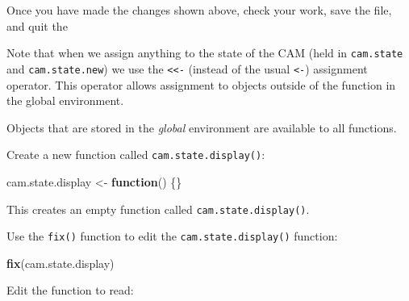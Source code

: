 \documentclass[12pt,a4paper]{book}
\newenvironment{Shaded}{\begin{snugshade}}{\end{snugshade}}
\newcommand{\ControlFlowTok}[1]{\textcolor[rgb]{0.13,0.29,0.53}{\textbf{#1}}}
\newcommand{\DataTypeTok}[1]{\textcolor[rgb]{0.13,0.29,0.53}{#1}}
\newcommand{\DecValTok}[1]{\textcolor[rgb]{0.00,0.00,0.81}{#1}}
\newcommand{\KeywordTok}[1]{\textcolor[rgb]{0.13,0.29,0.53}{\textbf{#1}}}
\newcommand{\NormalTok}[1]{#1}
\newcommand{\OperatorTok}[1]{\textcolor[rgb]{0.81,0.36,0.00}{\textbf{#1}}}
\newcommand{\OtherTok}[1]{\textcolor[rgb]{0.56,0.35,0.01}{#1}}
\newcommand{\StringTok}[1]{\textcolor[rgb]{0.31,0.60,0.02}{#1}}
\theoremstyle{definition}
\theoremstyle{definition}
\theoremstyle{definition}
\theoremstyle{remark}
\begin{document}
Once you have made the changes shown above, check your work, save the
file, and quit the

Note that when we assign anything to the state of the CAM (held in
\texttt{cam.state} and \texttt{cam.state.new}) we use the
\texttt{\textless{}\textless{}-} (instead of the usual
\texttt{\textless{}-}) assignment operator. This operator allows
assignment to objects outside of the function in the global environment.

Objects that are stored in the \emph{global} environment are available
to all functions.

Create a new function called \texttt{cam.state.display()}:

\begin{Shaded}
\begin{Highlighting}[]
\NormalTok{cam.state.display <-}\StringTok{ }\ControlFlowTok{function}\NormalTok{() \{\}}
\end{Highlighting}
\end{Shaded}

This creates an empty function called \texttt{cam.state.display()}.

Use the \texttt{fix()} function to edit the \texttt{cam.state.display()}
function:

\begin{Shaded}
\begin{Highlighting}[]
\KeywordTok{fix}\NormalTok{(cam.state.display)}
\end{Highlighting}
\end{Shaded}

Edit the function to read:

\begin{Shaded}
\end{Shaded}
\end{document}
